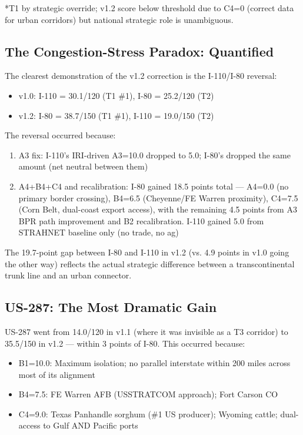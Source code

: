 *T1 by strategic override; v1.2 score below threshold due to C4=0 (correct data for urban corridors) but national strategic role is unambiguous.

\subsection{The Congestion-Stress Paradox: Quantified}

The clearest demonstration of the v1.2 correction is the I-110/I-80 reversal:

\begin{itemize}
\item v1.0: I-110 = 30.1/120 (T1 \#1), I-80 = 25.2/120 (T2)
\item v1.2: I-80 = 38.7/150 (T1 \#1), I-110 = 19.0/150 (T2)
\end{itemize}

The reversal occurred because:
\begin{enumerate}
\item A3 fix: I-110's IRI-driven A3=10.0 dropped to 5.0; I-80's dropped the same amount (net neutral between them)
\item A4+B4+C4 and recalibration: I-80 gained 18.5 points total --- A4=0.0 (no primary border crossing), B4=6.5 (Cheyenne/FE Warren proximity), C4=7.5 (Corn Belt, dual-coast export access), with the remaining 4.5 points from A3 BPR path improvement and B2 recalibration. I-110 gained 5.0 from STRAHNET baseline only (no trade, no ag)
\end{enumerate}

The 19.7-point gap between I-80 and I-110 in v1.2 (vs. 4.9 points in v1.0 going the other way) reflects the actual strategic difference between a transcontinental trunk line and an urban connector.

\subsection{US-287: The Most Dramatic Gain}

US-287 went from 14.0/120 in v1.1 (where it was invisible as a T3 corridor) to 35.5/150 in v1.2 --- within 3 points of I-80. This occurred because:

\begin{itemize}
\item B1=10.0: Maximum isolation; no parallel interstate within 200 miles across most of its alignment
\item B4=7.5: FE Warren AFB (USSTRATCOM approach); Fort Carson CO
\item C4=9.0: Texas Panhandle sorghum (\#1 US producer); Wyoming cattle; dual-access to Gulf AND Pacific ports
\end{itemize}

